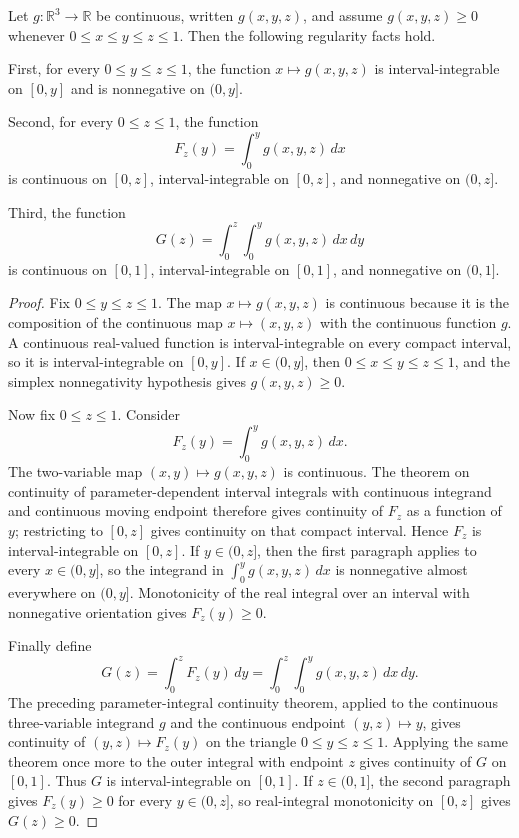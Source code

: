 \begin{helper}
Let \(g:\mathbb R^3\to\mathbb R\) be continuous, written \(g(x,y,z)\), and
assume \(g(x,y,z)\ge0\) whenever \(0\le x\le y\le z\le1\).  Then the following
regularity facts hold.

First, for every \(0\le y\le z\le1\), the function
\(x\mapsto g(x,y,z)\) is interval-integrable on \([0,y]\) and is nonnegative
on \((0,y]\).

Second, for every \(0\le z\le1\), the function
\[
F_z(y)=\int_0^y g(x,y,z)\,dx
\]
is continuous on \([0,z]\), interval-integrable on \([0,z]\), and
nonnegative on \((0,z]\).

Third, the function
\[
G(z)=\int_0^z\int_0^y g(x,y,z)\,dx\,dy
\]
is continuous on \([0,1]\), interval-integrable on \([0,1]\), and
nonnegative on \((0,1]\).
\end{helper}
\begin{proof}
Fix \(0\le y\le z\le1\).  The map \(x\mapsto g(x,y,z)\) is continuous because
it is the composition of the continuous map \(x\mapsto(x,y,z)\) with the
continuous function \(g\).  A continuous real-valued function is
interval-integrable on every compact interval, so it is interval-integrable on
\([0,y]\).  If \(x\in(0,y]\), then \(0\le x\le y\le z\le1\), and the simplex
nonnegativity hypothesis gives \(g(x,y,z)\ge0\).

Now fix \(0\le z\le1\).  Consider
\[
F_z(y)=\int_0^y g(x,y,z)\,dx .
\]
The two-variable map \((x,y)\mapsto g(x,y,z)\) is continuous.  The theorem on
continuity of parameter-dependent interval integrals with continuous
integrand and continuous moving endpoint therefore gives continuity of
\(F_z\) as a function of \(y\); restricting to \([0,z]\) gives continuity on
that compact interval.  Hence \(F_z\) is interval-integrable on \([0,z]\).  If
\(y\in(0,z]\), then the first paragraph applies to every \(x\in(0,y]\), so
the integrand in \(\int_0^y g(x,y,z)\,dx\) is nonnegative almost everywhere on
\((0,y]\).  Monotonicity of the real integral over an interval with
nonnegative orientation gives \(F_z(y)\ge0\).

Finally define
\[
G(z)=\int_0^z F_z(y)\,dy
=\int_0^z\int_0^y g(x,y,z)\,dx\,dy .
\]
The preceding parameter-integral continuity theorem, applied to the
continuous three-variable integrand \(g\) and the continuous endpoint
\((y,z)\mapsto y\), gives continuity of \((y,z)\mapsto F_z(y)\) on the
triangle \(0\le y\le z\le1\).  Applying the same theorem once more to the
outer integral with endpoint \(z\) gives continuity of \(G\) on \([0,1]\).
Thus \(G\) is interval-integrable on \([0,1]\).  If \(z\in(0,1]\), the second
paragraph gives \(F_z(y)\ge0\) for every \(y\in(0,z]\), so real-integral
monotonicity on \([0,z]\) gives \(G(z)\ge0\).
\end{proof}

